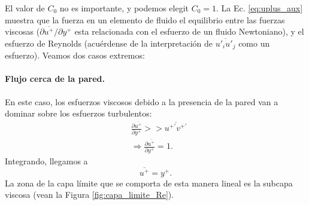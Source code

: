 El valor de $C_0$ no es importante, y podemos elegit $C_0=1$.
La Ec. \eqref{eq:uplus_aux} muestra que la fuerza en un elemento de fluido el equilibrio entre las fuerzas viscosas ($\partial \overline{u^+}/\partial y^+$ esta relacionada con el esfuerzo de un fluido Newtoniano), y el esfuerzo de Reynolds (acuérdense de la interpretación de $\overline{u'_iu'_j}$ como un esfuerzo).
Veamos dos casos extremos:

\paragraph*{Flujo cerca de la pared.} En este caso, los esfuerzos viscosos debido a la presencia de la pared van a dominar sobre los esfuerzos turbulentos:
%
\begin{align}
&\frac{\partial\overline{u^+}}{\partial y^+} >> \overline{u^{+\prime}v^{+\prime}}\nonumber\\
&\Rightarrow \frac{\partial\overline{u^+}}{\partial y^+} = 1.
\end{align}
%
Integrando, llegamos a
%
\begin{equation}\label{eq:subcapa_viscosa}
\overline{u^+} = y^+.
\end{equation}
%
La zona de la capa límite que se comporta de esta manera lineal es la subcapa viscosa (vean la Figura \ref{fig:capa_limite_Re}).

